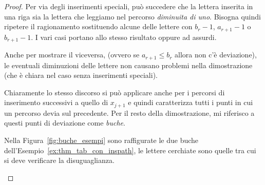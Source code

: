 \begin{proof}
    Per via degli inserimenti speciali, pu\`o succedere che la lettera inserita
    in una riga sia la lettera che leggiamo nel percorso \emph{diminuita di uno}.
    Bisogna quindi ripetere il ragionamento sostituendo alcune delle lettere
    con $b_r-1$, $a_{r+1}-1$ o $b_{r+1}-1$.
    I vari casi portano allo stesso risultato oppure ad assurdi.

    Anche per mostrare il viceversa, (ovvero se $a_{r+1} \leq b_r$ allora
    non c'\`e deviazione), le eventuali diminuzioni delle lettere non causano
    problemi nella dimostrazione (che \`e chiara nel caso senza inserimenti
    speciali).

    Chiaramente lo stesso discorso si pu\`o applicare anche per 
    i percorsi di inserimento successivi a quello di $x_{j+1}$ e quindi caratterizza
    tutti i punti in cui un percorso devia sul precedente.
    Per il resto della dimostrazione, mi riferisco a questi punti di deviazione come
    \emph{buche}.

    Nella Figura~\ref{fig:buche_esempi} sono raffigurate le due buche 
    dell'Esempio~\ref{ex:thm_tab_con_inspath}, le lettere cerchiate sono quelle
    tra cui si deve verificare la disuguaglianza.

    \begin{figure}
        \centering
\end{figure}
\end{proof}
